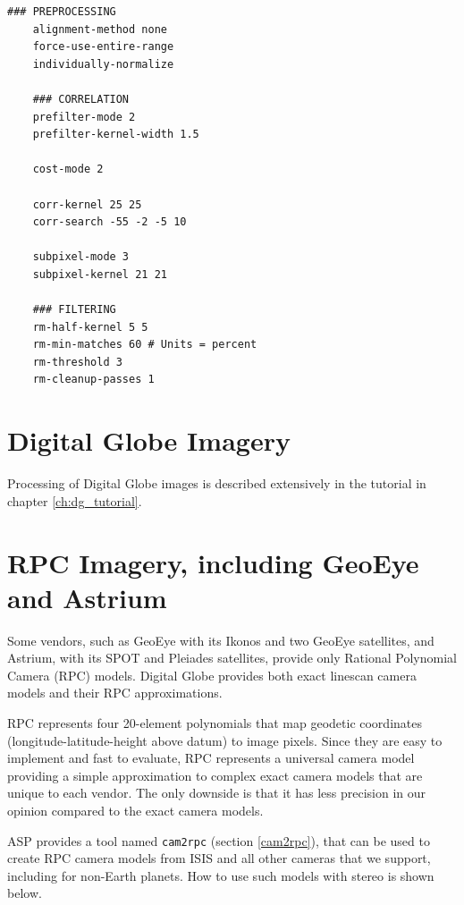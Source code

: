 \begin{center}\begin{minipage}{5.5in}
\begin{Verbatim}[frame=single,fontsize=\small,label=stereo.default for Cassini ISS]
    ### PREPROCESSING
    alignment-method none
    force-use-entire-range
    individually-normalize

    ### CORRELATION
    prefilter-mode 2
    prefilter-kernel-width 1.5

    cost-mode 2

    corr-kernel 25 25
    corr-search -55 -2 -5 10

    subpixel-mode 3
    subpixel-kernel 21 21

    ### FILTERING
    rm-half-kernel 5 5
    rm-min-matches 60 # Units = percent
    rm-threshold 3
    rm-cleanup-passes 1

\end{Verbatim}
\end{minipage}\end{center}

\section{Digital Globe Imagery}
\label{digital_globe_data}

Processing of Digital Globe images is described extensively in the
tutorial in chapter \ref{ch:dg_tutorial}.

\section{RPC Imagery, including GeoEye and Astrium}
\label{rpc}

Some vendors, such as GeoEye with its Ikonos and two GeoEye satellites,
and Astrium, with its SPOT and Pleiades satellites, provide only
Rational Polynomial Camera (RPC) models. Digital Globe provides both
exact linescan camera models and their RPC approximations.

RPC represents four 20-element polynomials that map geodetic coordinates
(longitude-latitude-height above datum)
to image pixels. Since they are easy to implement and fast to
evaluate, RPC represents a universal camera model providing a simple
approximation to complex exact camera models that are unique to each
vendor. The only downside is that it has less precision in our
opinion compared to the exact camera models.

ASP provides a tool named \texttt{cam2rpc} (section \ref{cam2rpc}), that can be
used to create RPC camera models from ISIS and all other cameras
that we support, including for non-Earth planets. How to use
such models with stereo is shown below.   

